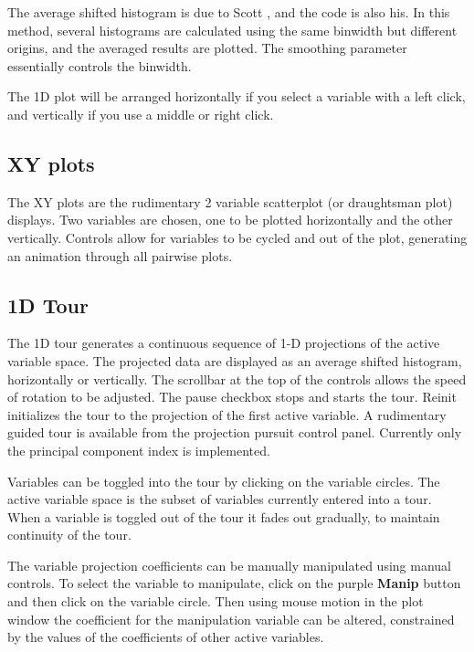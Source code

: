 \documentclass[11pt]{article}
\begin{document}
The average shifted histogram is due to Scott \cite{Scott92},
and the code is also his.  In this method, several histograms are
calculated using the same binwidth but different origins, and the
averaged results are plotted.  The smoothing parameter essentially
controls the binwidth.

The 1D plot will be arranged horizontally if you select a variable
with a left click, and vertically if you use a middle or right click.

\subsection{XY plots}

The XY plots are the rudimentary 2 variable scatterplot (or
draughtsman plot) displays. Two variables are chosen, one to be
plotted horizontally and the other vertically. Controls allow for
variables to be cycled and out of the plot, generating an animation
through all pairwise plots.

\subsection{1D Tour}
\label{slbl:1DTour}

The 1D tour generates a continuous sequence of 1-D projections of the
active variable space. The projected data are displayed as an average
shifted histogram, horizontally or vertically. The scrollbar at the
top of the controls allows the speed of rotation to be adjusted. The
pause checkbox stops and starts the tour. Reinit initializes the tour
to the projection of the first active variable. A rudimentary guided
tour is available from the projection pursuit control panel. Currently
only the principal component index is implemented.

Variables can be toggled into the tour by clicking on the variable
circles. The active variable space is the subset of variables
currently entered into a tour. When a variable is toggled out of the
tour it fades out gradually, to maintain continuity of the tour.

The variable projection coefficients can be manually manipulated using
manual controls. To select the variable to manipulate, click on the
purple {\bf Manip} button and then click on the variable circle. Then
using mouse motion in the plot window the coefficient for the
manipulation variable can be altered, constrained by the values of the
coefficients of other active variables.
\end{document}
